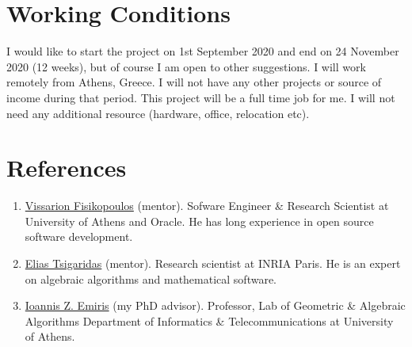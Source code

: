 \documentclass[a4paper, 12pt]{article}
\begin{document}
\section{Working Conditions}
I would like to start the project on 1st September 2020 and end on 24 November 2020 (12 weeks), but of course I am open to other suggestions. I will work remotely from Athens, Greece. I will not have any other projects or source of income during that period. This project will be a full time job for me. I will not need any additional resource (hardware, office, relocation etc).


\section{References}
\begin{enumerate}
    \item \textcolor{blue}{\href{https://vissarion.github.io/}{Vissarion Fisikopoulos}} (mentor). Sofware Engineer \& Research Scientist at University of Athens and Oracle. He has long experience in open source software development.
    \item \textcolor{blue}{\href{https://who.paris.inria.fr/Elias.Tsigaridas/}{Elias Tsigaridas}} (mentor). Research scientist at INRIA Paris. He is an expert on algebraic algorithms and mathematical software.
    \item \textcolor{blue}{\href{http://cgi.di.uoa.gr/~emiris/}{Ioannis Z. Emiris}} (my PhD advisor). Professor, Lab of Geometric \& Algebraic Algorithms Department of Informatics \& Telecommunications at University of Athens. 
\end{enumerate}

\printbibliography[title=Bibliography]
\end{document}

